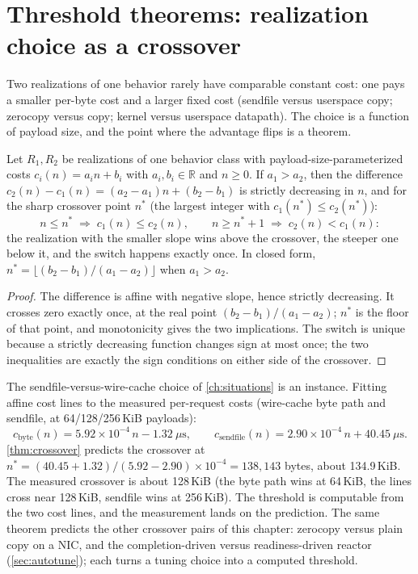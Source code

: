 \section{Threshold theorems: realization choice as a crossover}\label{sec:threshold}

Two realizations of one behavior rarely have comparable constant cost:
one pays a smaller per-byte cost and a larger fixed cost (sendfile
versus userspace copy; zerocopy versus copy; kernel versus userspace
datapath). The choice is a function of payload size, and the point
where the advantage flips is a theorem.

\begin{theorem}\label{thm:crossover}
Let $R_1, R_2$ be realizations of one behavior class with
payload-size-parameterized costs $c_i (n) = a_i n + b_i$ with
$a_i, b_i \in \mathbb{R}$ and $n \geq 0$. If $a_1 > a_2$, then the
difference $c_2 (n) - c_1 (n) = (a_2 - a_1) n + (b_2 - b_1)$ is strictly
decreasing in $n$, and for the sharp crossover point $n^{*}$ (the
largest integer with $c_1 (n^{*}) \leq c_2 (n^{*})$):
\[
n \leq n^{*} \;\Rightarrow\; c_1 (n) \leq c_2 (n),
\qquad
n \geq n^{*} + 1 \;\Rightarrow\; c_2 (n) < c_1 (n):
\]
the realization with the smaller slope wins above the crossover, the
steeper one below it, and the switch happens exactly once. In closed
form, $n^{*} = \lfloor (b_2 - b_1)/(a_1 - a_2) \rfloor$ when
$a_1 > a_2$.
\end{theorem}

\begin{proof}
The difference is affine with negative slope, hence strictly
decreasing. It crosses zero exactly once, at the real point
$(b_2 - b_1)/(a_1 - a_2)$; $n^{*}$ is the floor of that point, and
monotonicity gives the two implications. The switch is unique because
a strictly decreasing function changes sign at most once; the two
inequalities are exactly the sign conditions on either side of the
crossover.
\end{proof}

\begin{remark}
The sendfile-versus-wire-cache choice of \autoref{ch:situations} is an
instance. Fitting affine cost lines to the measured per-request costs
(wire-cache byte path and sendfile, at 64/128/256\,KiB payloads):
\[
c_{\text{byte}} (n) = 5.92\times 10^{-4}\, n - 1.32\ \mu\mathrm{s},
\qquad
c_{\text{sendfile}} (n) = 2.90\times 10^{-4}\, n + 40.45\ \mu\mathrm{s}.
\]
\autoref{thm:crossover} predicts the crossover at
$n^{*} = (40.45 + 1.32)/(5.92 - 2.90) \times 10^{-4} = 138{,}143$ bytes,
about 134.9\,KiB. The measured crossover is about 128\,KiB (the byte
path wins at 64\,KiB, the lines cross near 128\,KiB, sendfile wins at
256\,KiB). The threshold is computable from the two cost lines, and the
measurement lands on the prediction. The same theorem predicts the
other crossover pairs of this chapter: zerocopy versus plain copy on a
NIC, and the completion-driven versus readiness-driven reactor
(\autoref{sec:autotune}); each turns a tuning choice into a computed
threshold.
\end{remark}

